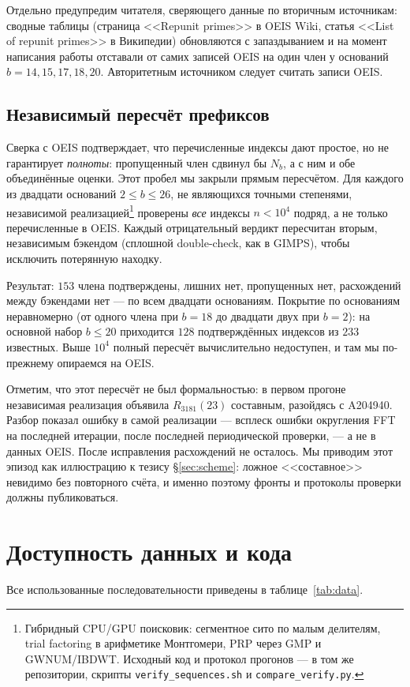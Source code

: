\documentclass[11pt,a4paper]{article}
\theoremstyle{plain}
\theoremstyle{remark}
\begin{document}
Отдельно предупредим читателя, сверяющего данные по вторичным источникам: сводные
таблицы (страница <<Repunit primes>> в OEIS Wiki, статья <<List of repunit primes>>
в Википедии) обновляются с запаздыванием и на момент написания работы отставали
от самих записей OEIS на один член у оснований $b=14,15,17,18,20$. Авторитетным
источником следует считать записи OEIS.

\subsection*{Независимый пересчёт префиксов}

Сверка с OEIS подтверждает, что перечисленные индексы дают простое, но не
гарантирует \emph{полноты}: пропущенный член сдвинул бы $N_b$, а с ним и обе
объединённые оценки. Этот пробел мы закрыли прямым пересчётом. Для каждого из
двадцати оснований $2\le b\le26$, не являющихся точными степенями, независимой
реализацией\footnote{Гибридный CPU/GPU поисковик: сегментное сито по малым
делителям, trial factoring в арифметике Монтгомери, PRP через GMP и GWNUM/IBDWT.
Исходный код и протокол прогонов --- в том же репозитории, скрипты
\texttt{verify\_sequences.sh} и \texttt{compare\_verify.py}.} проверены
\emph{все} индексы $n<10^4$ подряд, а не только перечисленные в OEIS. Каждый
отрицательный вердикт пересчитан вторым, независимым бэкендом (сплошной
double-check, как в GIMPS), чтобы исключить потерянную находку.

Результат: $153$ члена подтверждены, лишних нет, пропущенных нет, расхождений
между бэкендами нет --- по всем двадцати основаниям. Покрытие по основаниям
неравномерно (от одного члена при $b=18$ до двадцати двух при $b=2$): на
основной набор $b\le20$ приходится $128$ подтверждённых индексов из $233$
известных. Выше $10^4$ полный пересчёт вычислительно недоступен, и там мы
по-прежнему опираемся на OEIS.

Отметим, что этот пересчёт не был формальностью: в первом прогоне независимая
реализация объявила $R_{3181}(23)$ составным, разойдясь с A204940. Разбор показал
ошибку в самой реализации --- всплеск ошибки округления FFT на последней итерации,
после последней периодической проверки, --- а не в данных OEIS. После исправления
расхождений не осталось. Мы приводим этот эпизод как иллюстрацию к тезису
\S\ref{sec:scheme}: ложное <<составное>> невидимо без повторного счёта, и именно
поэтому фронты и протоколы проверки должны публиковаться.

\section*{Доступность данных и кода}
Все использованные последовательности приведены в таблице~\ref{tab:data}.
\end{document}
